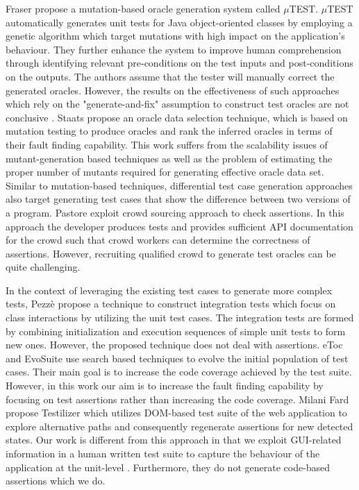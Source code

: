Fraser \etal \cite{fraser:tse12} propose a mutation-based oracle generation system called $\mu$TE\-ST. $\mu$TE\-ST automatically generates unit tests for Java object-oriented classes by employing a genetic algorithm which target mutations with high impact on the application's behaviour. They further enhance the system \cite{fraser:issta11} to improve human comprehension through identifying relevant pre-conditions on the test inputs and post-conditions on the outputs. The authors assume that the tester will manually correct the generated oracles. However, the results on the effectiveness of such approaches which rely on the "generate-and-fix" assumption to construct test oracles are not conclusive \cite{fraser:issta13}.
Staats \etal \cite{staats:icse12} propose an oracle data selection technique, which is based on mutation testing to produce oracles and rank the inferred oracles in terms of their fault finding capability. This work suffers from the scalability issues of mutant-generation based techniques as well as the problem of estimating the proper number of mutants required for generating effective oracle data set.
Similar to mutation-based techniques, differential test case generation approaches \cite{taneja:ase08, elbaum:tse09} also target generating test cases that show the difference between two versions of a program. %
Pastore \etal \cite{pastore:icst13} exploit crowd sourcing approach to check assertions. In this approach the developer produces tests and provides sufficient API documentation for the crowd such that crowd workers can determine the correctness of assertions. However, recruiting qualified crowd to generate test oracles can be quite challenging.

In the context of leveraging the existing test cases to generate more complex tests, Pezz\`e \etal \cite{pezze:icst13} propose a technique to construct integration tests which focus on class interactions by utilizing the unit test cases. 
The integration tests are formed by combining initialization and execution sequences of simple unit tests to form new ones. However, the proposed technique does not deal with assertions.
eToc \cite{tonella:issta04} and EvoSuite \cite{fraser:icst12} use search based techniques to evolve the initial population of test cases. Their main goal is to increase the code coverage achieved by the test suite. However, in this work our aim is to increase the fault finding capability by focusing on test assertions rather than increasing the code coverage.
Milani Fard \etal \cite{milanifard:ase14} propose Testilizer which utilizes DOM-based test suite of the web application to explore alternative paths and consequently regenerate assertions for new detected states. Our work is different from this approach in that we exploit GUI-related information in a human written test suite to capture the behaviour of the application at the unit-level \javascript. Furthermore, they do not generate code-based assertions which we do.
